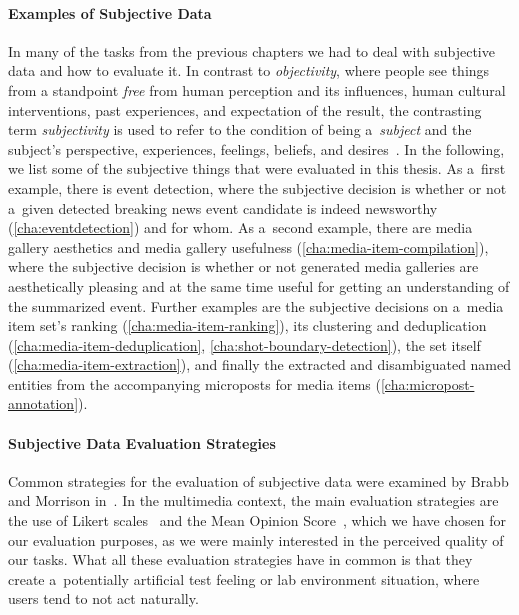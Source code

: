 \paragraph{Examples of Subjective Data}

In many of the tasks from the previous chapters
we had to deal with subjective data and how to evaluate it.
In contrast to \emph{objectivity}, where people see things
from a standpoint \emph{free} from human perception and its influences,
human cultural interventions, past experiences,
and expectation of the result,
the contrasting term \emph{subjectivity} is used to refer to the condition
of being a~\emph{subject} and the subject's perspective, experiences,
feelings, beliefs, and desires~\cite{honderich2005oxford}.
In the following, we list some of the subjective things
that were evaluated in this thesis.
As a~first example, there is event detection,
where the subjective decision is whether or not a~given detected breaking news event candidate is indeed newsworthy (\autoref{cha:eventdetection}) and for whom.
As a~second example, there are media gallery aesthetics and media gallery usefulness
(\autoref{cha:media-item-compilation}),
where the subjective decision is whether
or not generated media galleries are aesthetically pleasing 
and at the same time useful for getting an understanding
of the summarized event.
Further examples are the subjective decisions on a~media item set's
ranking (\autoref{cha:media-item-ranking}),
its clustering and deduplication (\autoref{cha:media-item-deduplication}, \autoref{cha:shot-boundary-detection}),
the set itself (\autoref{cha:media-item-extraction}),
and finally the extracted and disambiguated named entities
from the accompanying microposts for media items
(\autoref{cha:micropost-annotation}).

\paragraph{Subjective Data Evaluation Strategies}

Common strategies for the evaluation of subjective data were 
examined by Brabb and Morrison in~\cite{brabb1964evaluation}.
In the multimedia context, the main evaluation strategies are
the use of Likert scales~\cite{likert1932likertscale} 
and the Mean Opinion Score~\cite{itu1998mos},
which we have chosen for our evaluation purposes,
as we were mainly interested in the perceived quality of our tasks.
What all these evaluation strategies have in common is
that they create a~potentially artificial test feeling
or lab environment situation, where users tend to not act naturally.

